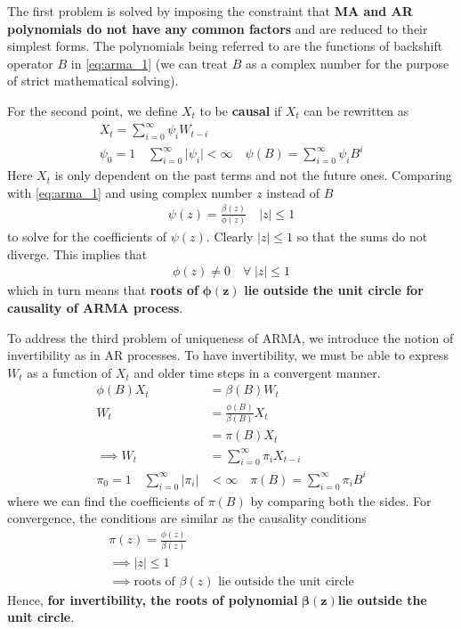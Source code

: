 \documentclass[../../time_series_notes.tex]{subfiles}
\begin{document}
The first problem is solved by imposing the constraint that \textbf{MA and AR polynomials do not have any common factors} and are reduced to their simplest forms. The polynomials being referred to are the functions of backshift operator $B$ in \eqref{eq:arma_1} (we can treat $B$ as a complex number for the purpose of strict mathematical solving).\newline

For the second point, we define $X_{t}$ to be \textbf{causal} if $X_{t}$ can be rewritten as
\begin{gather*}
    X_{t} = \sum_{i=0}^{\infty} \psi_{i} W_{t-i}\\
    \psi_{0} = 1 \quad \sum_{i=0}^{\infty} \lvert \psi_{i} \rvert < \infty \quad \psi(B) = \sum_{i=0}^{\infty} \psi_{i}B^{i}
\end{gather*}
Here $X_{t}$ is only dependent on the past terms and not the future ones. Comparing with \eqref{eq:arma_1} and using complex number $z$ instead of $B$
\begin{align*}
    \psi(z) = \frac{\beta(z)}{\phi(z)} \quad \lvert z \rvert \leq 1
\end{align*}
to solve for the coefficients of $\psi(z)$. Clearly $\lvert z \rvert \leq 1$ so that the sums do not diverge. This implies that
\begin{align*}
    \phi(z) \neq 0 \quad \forall \; \lvert z \rvert \leq 1
\end{align*}
which in turn means that \textbf{roots of }$\bm{\phi(z)}$ \textbf{lie outside the unit circle for causality of ARMA process}.\newline

To address the third problem of uniqueness of ARMA, we introduce the notion of invertibility as in AR processes. To have invertibility, we must be able to express $W_{t}$ as a function of $X_{t}$ and older time steps in a convergent manner.
\begin{align*}
    \phi(B)X_{t} &= \beta(B)W_{t}\\
    W_{t} &= \frac{\phi(B)}{\beta(B)}X_{t}\\
    &= \pi(B)X_{t}\\
    \implies W_{t} &= \sum_{i=0}^{\infty} \pi_{i}X_{t-i}\\
    \pi_{0} = 1 \quad \sum_{i=0}^{\infty} \lvert \pi_{i} \rvert &< \infty \quad \pi(B) = \sum_{i=0}^{\infty} \pi_{i}B^{i}
\end{align*}
where we can find the coefficients of $\pi(B)$ by comparing both the sides. For convergence, the conditions are similar as the causality conditions
\begin{gather*}
    \pi(z) = \frac{\phi(z)}{\beta(z)}\\
    \implies \lvert z \rvert \leq 1\\
    \implies \text{roots of $\beta(z)$ lie outside the unit circle}
\end{gather*}
Hence, \textbf{for invertibility, the roots of polynomial }$\bm{\beta(z)}$\textbf{lie outside the unit circle}.\newline
\end{document}
